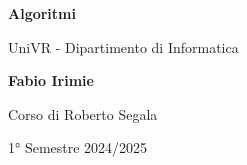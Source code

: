 \begin{titlepage}
	\begin{center}
		\vspace*{1cm}

		\Huge
		\textbf{Algoritmi}

		\vspace{0.5cm}
		\LARGE
		UniVR - Dipartimento di Informatica

		\vspace{1.5cm}

		\textbf{Fabio Irimie}

		\vfill


		\vspace{0.8cm}

    Corso di Roberto Segala

		1° Semestre 2024/2025

	\end{center}
\end{titlepage}
